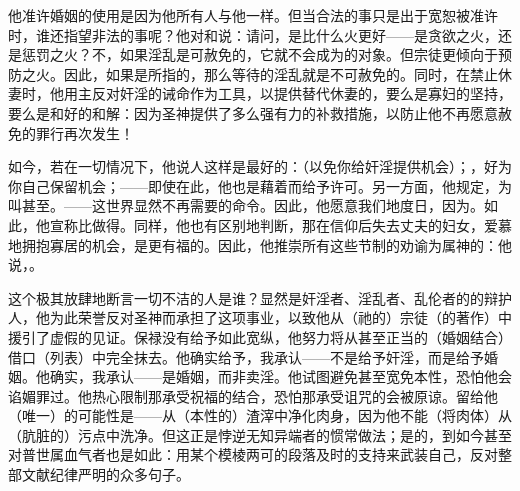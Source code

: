 他准许婚姻的使用是因为他所有人与他一样。但当合法的事只是出于宽恕被准许时，谁还指望非法的事呢？他对和说：请问，是比什么火更好——是贪欲之火，还是惩罚之火？不，如果淫乱是可赦免的，它就不会成为的对象。但宗徒更倾向于预防之火。因此，如果是所指的，那么等待的淫乱就是不可赦免的。同时，在禁止休妻时，他用主反对奸淫的诫命作为工具，以提供替代休妻的，要么是寡妇的坚持，要么是和好的和解：因为圣神提供了多么强有力的补救措施，以防止他不再愿意赦免的罪行再次发生！\par

如今，若在一切情况下，他说人这样是最好的：（以免你给奸淫提供机会）；，好为你自己保留机会；——即使在此，他也是藉着而给予许可。另一方面，他规定，为叫甚至。——这世界显然不再需要的命令。因此，他愿意我们地度日，因为。如此，他宣称比做得。同样，他也有区别地判断，那在信仰后失去丈夫的妇女，爱慕地拥抱寡居的机会，是更有福的。因此，他推崇所有这些节制的劝谕为属神的：他说，。\par

这个极其放肆地断言一切不洁的人是谁？显然是奸淫者、淫乱者、乱伦者的的辩护人，他为此荣誉反对圣神而承担了这项事业，以致他从（祂的）宗徒（的著作）中援引了虚假的见证。保禄没有给予如此宽纵，他努力将从甚至正当的（婚姻结合）借口（列表）中完全抹去。他确实给予，我承认——不是给予奸淫，而是给予婚姻。他确实，我承认——是婚姻，而非卖淫。他试图避免甚至宽免本性，恐怕他会谄媚罪过。他热心限制那承受祝福的结合，恐怕那承受诅咒的会被原谅。留给他（唯一）的可能性是——从（本性的）渣滓中净化肉身，因为他不能（将肉体）从（肮脏的）污点中洗净。但这正是悖逆无知异端者的惯常做法；是的，到如今甚至对普世属血气者也是如此：用某个模棱两可的段落及时的支持来武装自己，反对整部文献纪律严明的众多句子。\par

